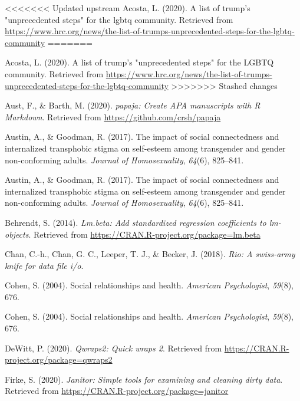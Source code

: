 \documentclass[
  english,
  man,floatsintext]{apa6}
\begin{document}
\hypertarget{refs}{}
<<<<<<< Updated upstream
\leavevmode\hypertarget{ref-Acosta2020}{}%
Acosta, L. (2020). A list of trump's "unprecedented steps" for the lgbtq community. Retrieved from \url{https://www.hrc.org/news/the-list-of-trumps-unprecedented-steps-for-the-lgbtq-community}
=======
\begin{CSLReferences}{1}{0}
\leavevmode\hypertarget{ref-Acosta2020}{}%
Acosta, L. (2020). A list of trump's "unprecedented steps" for the LGBTQ community. Retrieved from \url{https://www.hrc.org/news/the-list-of-trumps-unprecedented-steps-for-the-lgbtq-community}
>>>>>>> Stashed changes

\leavevmode\hypertarget{ref-R-papaja}{}%
Aust, F., \& Barth, M. (2020). \emph{papaja: Create APA manuscripts with R Markdown}. Retrieved from \url{https://github.com/crsh/papaja}

\leavevmode\hypertarget{ref-austin2017}{}%
Austin, A., \& Goodman, R. (2017). The impact of social connectedness and internalized transphobic stigma on self-esteem among transgender and gender non-conforming adults. \emph{Journal of Homosexuality}, \emph{64}(6), 825--841.

\leavevmode\hypertarget{ref-austin2017}{}%
Austin, A., \& Goodman, R. (2017). The impact of social connectedness and internalized transphobic stigma on self-esteem among transgender and gender non-conforming adults. \emph{Journal of Homosexuality}, \emph{64}(6), 825--841.

\leavevmode\hypertarget{ref-R-lm.beta}{}%
Behrendt, S. (2014). \emph{Lm.beta: Add standardized regression coefficients to lm-objects}. Retrieved from \url{https://CRAN.R-project.org/package=lm.beta}

\leavevmode\hypertarget{ref-R-rio}{}%
Chan, C.-h., Chan, G. C., Leeper, T. J., \& Becker, J. (2018). \emph{Rio: A swiss-army knife for data file i/o}.

\leavevmode\hypertarget{ref-cohen2004}{}%
Cohen, S. (2004). Social relationships and health. \emph{American Psychologist}, \emph{59}(8), 676.

\leavevmode\hypertarget{ref-cohen2004}{}%
Cohen, S. (2004). Social relationships and health. \emph{American Psychologist}, \emph{59}(8), 676.

\leavevmode\hypertarget{ref-R-qwraps2}{}%
DeWitt, P. (2020). \emph{Qwraps2: Quick wraps 2}. Retrieved from \url{https://CRAN.R-project.org/package=qwraps2}

\leavevmode\hypertarget{ref-R-janitor}{}%
Firke, S. (2020). \emph{Janitor: Simple tools for examining and cleaning dirty data}. Retrieved from \url{https://CRAN.R-project.org/package=janitor}


\end{CSLReferences}
\end{document}
